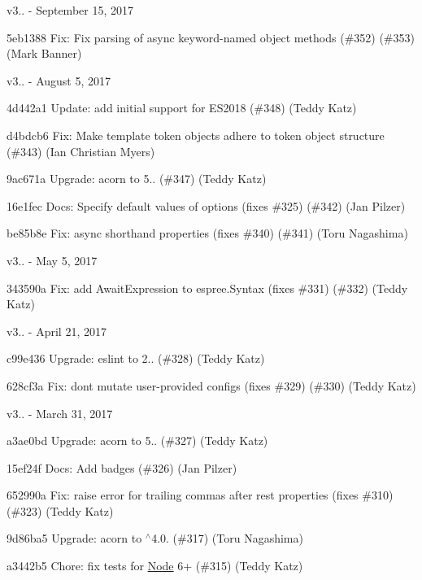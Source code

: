 v3.. -\/ September 15, 2017


\begin{DoxyItemize}
\item 5eb1388 Fix\+: Fix parsing of async keyword-\/named object methods (\#352) (\#353) (Mark Banner)
\end{DoxyItemize}

v3.. -\/ August 5, 2017


\begin{DoxyItemize}
\item 4d442a1 Update\+: add initial support for E\+S2018 (\#348) (Teddy Katz)
\item d4bdcb6 Fix\+: Make template token objects adhere to token object structure (\#343) (Ian Christian Myers)
\item 9ac671a Upgrade\+: acorn to 5.. (\#347) (Teddy Katz)
\item 16e1fec Docs\+: Specify default values of options (fixes \#325) (\#342) (Jan Pilzer)
\item be85b8e Fix\+: async shorthand properties (fixes \#340) (\#341) (Toru Nagashima)
\end{DoxyItemize}

v3.. -\/ May 5, 2017


\begin{DoxyItemize}
\item 343590a Fix\+: add Await\+Expression to espree.\+Syntax (fixes \#331) (\#332) (Teddy Katz)
\end{DoxyItemize}

v3.. -\/ April 21, 2017


\begin{DoxyItemize}
\item c99e436 Upgrade\+: eslint to 2.. (\#328) (Teddy Katz)
\item 628cf3a Fix\+: don\textquotesingle{}t mutate user-\/provided configs (fixes \#329) (\#330) (Teddy Katz)
\end{DoxyItemize}

v3.. -\/ March 31, 2017


\begin{DoxyItemize}
\item a3ae0bd Upgrade\+: acorn to 5.. (\#327) (Teddy Katz)
\item 15ef24f Docs\+: Add badges (\#326) (Jan Pilzer)
\item 652990a Fix\+: raise error for trailing commas after rest properties (fixes \#310) (\#323) (Teddy Katz)
\item 9d86ba5 Upgrade\+: acorn to $^\wedge$4.0. (\#317) (Toru Nagashima)
\item a3442b5 Chore\+: fix tests for \mbox{\hyperlink{class_node}{Node}} 6+ (\#315) (Teddy Katz)
\end{DoxyItemize}

